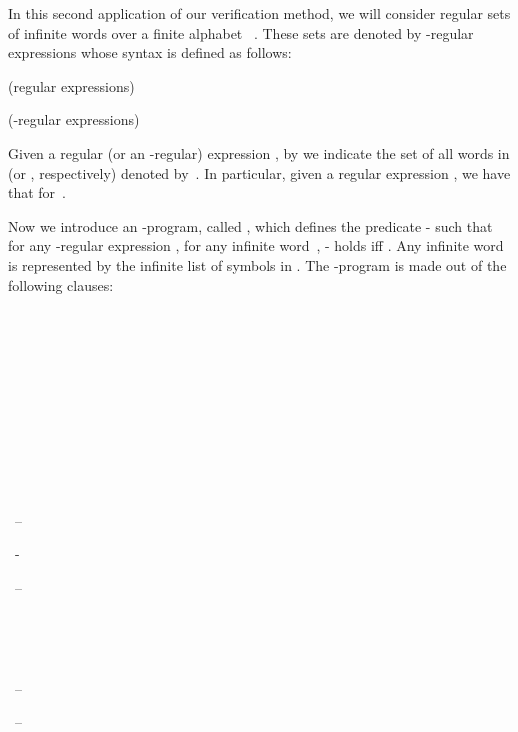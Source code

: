 \documentclass[english]{tlp}
\begin{document}
\begin{example}

In this second application of our verification method, we will consider
regular sets of infinite words over a finite alphabet ~\cite{Tho90}. 
These sets are
denoted by -regular expressions whose syntax is defined as follows: 

\smallskip
\makebox[45mm][l]{}(regular expressions)

\smallskip
\makebox[70mm][l]{}(-regular expressions)

\smallskip
\noindent Given a regular (or an -regular) expression ,
by  we indicate the set of all words in  
(or , respectively) denoted by~.
In particular, given a regular expression , we have that
for~.

Now we introduce an -program, called
, which defines the predicate - such
that for any -regular expression , for any infinite word~,
\mbox{-} holds iff .
Any infinite word  is represented by the infinite
list   of symbols in . 
The -program  is made out of the following clauses:

\smallskip



~

~

~

~

~

~




~--

~-



~--

~

~

~--

~--



\makebox[70mm][l]{~}


~



\end{example}
\end{document}
